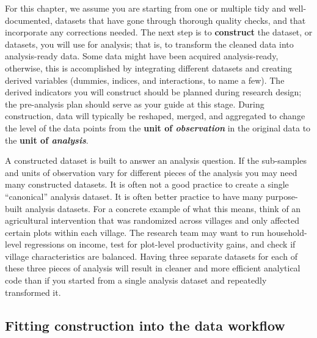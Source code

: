 For this chapter, we assume you are starting from 
one or multiple tidy\cite{hadley2017R}
and well-documented, 
datasets that have gone through thorough quality checks,
and that incorporate any corrections needed.
The next step is to \textbf{construct}
the dataset, or datasets, you will use for analysis;
that is, to transform the cleaned data into analysis-ready data.
Some data might have been acquired analysis-ready,
otherwise, this is accomplished by integrating different datasets
and creating derived variables
(dummies, indices, and interactions, to name a few).
The derived indicators you will construct should be
planned during research design;
the pre-analysis plan should serve as your guide
at this stage.
During construction, data will typically be
reshaped, merged, and aggregated to change the level of the data points
from the \textbf{unit of \textit{observation}} in the original data
to the \textbf{unit of \textit{analysis}}.

A constructed dataset is built to answer an analysis question.
If the sub-samples and units of observation 
vary for different pieces of the analysis
you may need many constructed datasets.
It is often not a good practice
to create a single ``canonical'' analysis dataset.
It is often better practice to have 
many purpose-built analysis datasets.
For a concrete example of what this means,
think of an agricultural intervention 
that was randomized across villages
and only affected certain plots within each village.
The research team may want to 
run household-level regressions on income,
test for plot-level productivity gains,
and check if village characteristics are balanced.
Having three separate datasets for each of these three pieces of analysis
will result in cleaner and more efficient analytical code than if
you started from a single analysis dataset and repeatedly transformed it.

\subsection{Fitting construction into the data workflow}


